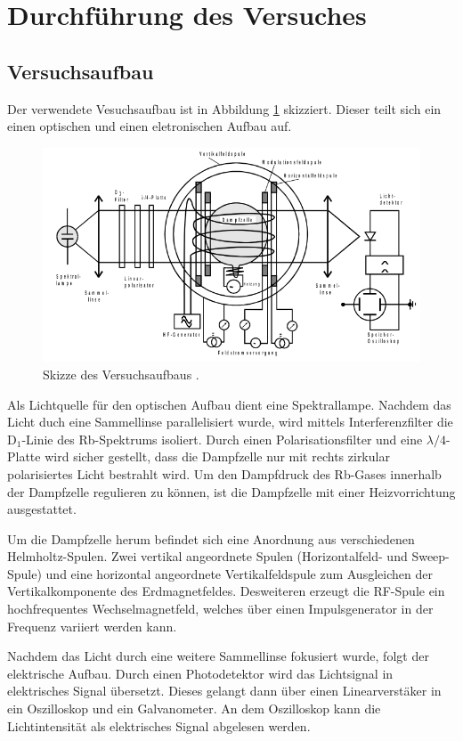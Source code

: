 \section{Durchführung des Versuches}
\label{sec:Durchführung}
\subsection{Versuchsaufbau}
Der verwendete Vesuchsaufbau ist in Abbildung \ref{fig:Aufbau} skizziert.
Dieser teilt sich ein einen optischen und einen eletronischen Aufbau auf.
\begin{figure}[H]
    \centering
    \includegraphics[scale= 0.4]{pictures/aufbau.png}
    \caption{Skizze des Versuchsaufbaus \cite{V21}.}
    \label{fig:Aufbau}
\end{figure}
\noindent
Als Lichtquelle für den optischen Aufbau dient eine Spektrallampe.
Nachdem das Licht duch eine Sammellinse parallelisiert wurde, wird 
mittels Interferenzfilter die $\text{D}_\text{1}$-Linie des 
Rb-Spektrums isoliert. Durch einen Polarisationsfilter und eine 
$\lambda/4$-Platte wird sicher gestellt, dass die Dampfzelle nur mit 
rechts zirkular polarisiertes Licht bestrahlt wird. Um den Dampfdruck 
des Rb-Gases innerhalb der Dampfzelle regulieren zu können, ist die 
Dampfzelle mit einer Heizvorrichtung ausgestattet. 

\noindent
Um die Dampfzelle
herum befindet sich eine Anordnung aus verschiedenen Helmholtz-Spulen.
Zwei vertikal angeordnete Spulen (Horizontalfeld- und Sweep-Spule) und 
eine horizontal angeordnete Vertikalfeldspule zum Ausgleichen der 
Vertikalkomponente des Erdmagnetfeldes. Desweiteren erzeugt die 
RF-Spule ein hochfrequentes Wechselmagnetfeld, welches über einen 
Impulsgenerator in der Frequenz variiert werden kann. 

\noindent
Nachdem das Licht durch eine weitere Sammellinse fokusiert wurde, folgt 
der elektrische Aufbau. Durch einen Photodetektor wird das Lichtsignal
in elektrisches Signal übersetzt. Dieses gelangt dann über einen 
Linearverstäker in ein Oszilloskop und ein Galvanometer. An dem 
Oszilloskop kann die Lichtintensität als elektrisches Signal abgelesen
werden.

